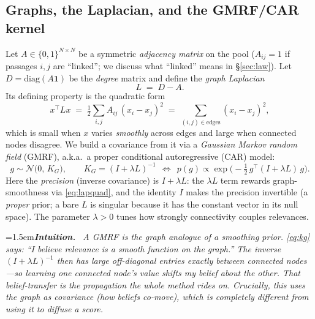 \documentclass[11pt]{article}
\newenvironment{intuition}{\par\smallskip\noindent\hangindent=1.5em\textbf{\itshape Intuition.}\itshape\ \ignorespaces}{\par\smallskip}
\newcommand{\N}{\mathcal{N}}
\begin{document}
\subsection{Graphs, the Laplacian, and the GMRF/CAR kernel}\label{sec:gmrf}
Let $A\in\{0,1\}^{N\times N}$ be a symmetric \emph{adjacency matrix} on the pool ($A_{ij}=1$ if passages $i,j$
are ``linked''; we discuss what ``linked'' means in \S\ref{sec:law}). Let $D=\mathrm{diag}(A\mathbf 1)$ be the
\emph{degree} matrix and define the \emph{graph Laplacian}
\begin{equation}
  L \;=\; D - A .
\end{equation}
Its defining property is the quadratic form
\begin{equation}\label{eq:lapquad}
  x^\top L x \;=\; \tfrac12\sum_{i,j} A_{ij}\,(x_i-x_j)^2 \;=\; \sum_{(i,j)\in\text{edges}}(x_i-x_j)^2,
\end{equation}
which is small when $x$ varies \emph{smoothly} across edges and large when connected nodes disagree. We build a
covariance from it via a \emph{Gaussian Markov random field} (GMRF), a.k.a.\ a proper conditional
autoregressive (CAR) model:
\begin{equation}\label{eq:kg}
  g \sim \N\!\big(0,\,K_G\big),\qquad K_G = (I+\lambda L)^{-1}\ \ \Longleftrightarrow\ \
  p(g)\propto \exp\!\Big(-\tfrac12\,g^\top (I+\lambda L)\,g\Big).
\end{equation}
Here the \emph{precision} (inverse covariance) is $I+\lambda L$: the $\lambda L$ term rewards graph-smoothness
via \eqref{eq:lapquad}, and the identity $I$ makes the precision invertible (a \emph{proper} prior; a bare $L$
is singular because it has the constant vector in its null space). The parameter $\lambda>0$ tunes how strongly
connectivity couples relevances.

\begin{intuition}
A GMRF is the graph analogue of a smoothing prior. \eqref{eq:kg} says: ``I believe relevance is a smooth
function on the graph.'' The inverse $(I+\lambda L)^{-1}$ then has large off-diagonal entries exactly between
connected nodes---so \emph{learning one connected node's value shifts my belief about the other}. That
belief-transfer is the propagation the whole method rides on. Crucially, this uses the graph as
\emph{covariance} (how beliefs co-move), which is completely different from using it to diffuse a score.
\end{intuition}
\end{document}
